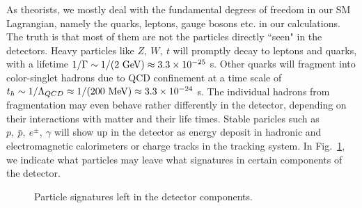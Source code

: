 \documentclass[12pt,prd,aps,floats,preprintnumbers,preprint,superscriptaddress,floatfix,nofootinbib]{revtex4}
\def\mev{{\rm MeV}}
\def\gev{{\rm GeV}}
\begin{document}
As theorists, we  mostly deal with the fundamental degrees of freedom 
in our SM Lagrangian, 
namely the quarks, leptons, gauge bosons etc. in our calculations.
 The truth is that most of them  are not  the particles
directly ``seen" in the detectors.  Heavy particles like $Z,\ W,\ t$ 
will promptly decay to leptons and quarks, with a lifetime
$1/\Gamma \sim 1/(2\ \gev) \approx 3.3\times 10^{-25}$ s.
Other quarks will fragment into color-singlet hadrons due to 
QCD confinement at a time scale of 
$t_h\sim 1/\Lambda_{QCD} \approx 1/(200\ \mev)\approx 3.3\times10^{-24}$ s.
The individual hadrons from fragmentation may even behave
rather differently in the detector, depending on their interactions with
matter and their life times. 
Stable paricles such as $p,\ \bar p,\ e^\pm,\ \gamma$  will
show up in the detector as energy deposit in hadronic and electromagnetic
calorimeters or charge tracks in the tracking system.
In Fig.~\ref{fig:showup},  we indicate what particles may leave 
what signatures in certain components of the detector.

\begin{center}
\begin{figure}[tb]
\caption{Particle signatures left in the detector components.
\label{fig:showup}}
\end{figure}
\end{center}
\end{document}

